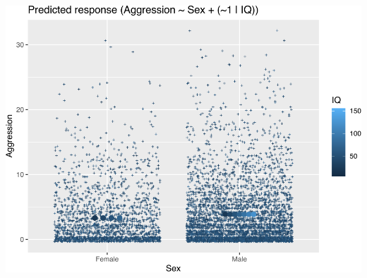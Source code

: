 \documentclass{article}
\begin{document}
\begin{center}\includegraphics[width=0.75\linewidth]{WorkingDraft_files/figure-latex/my-figure-1} \end{center}
\end{document}
